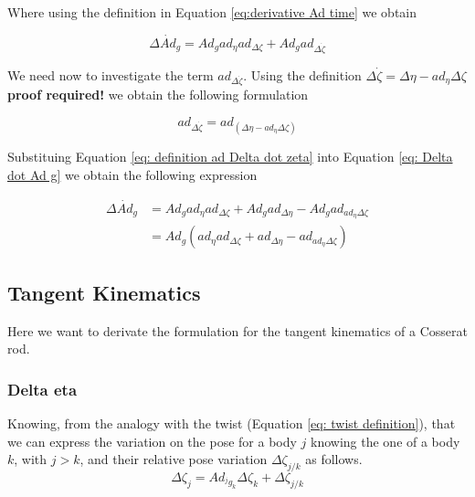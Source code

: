 \documentclass[12pt,a4paper]{book}
\begin{document}
Where using the definition in Equation \eqref{eq:derivative Ad time} we obtain 

\begin{equation}\label{eq: Delta dot Ad g}
	\Delta \dot{Ad}_g = Ad_g ad_\eta ad_{\Delta \zeta} + Ad_g  ad_{\Delta \dot{\zeta} }
\end{equation}

We need now to investigate the term $ad_{\Delta \dot{\zeta} }$. Using the definition $\Delta \dot{\zeta} = \Delta \eta - ad_\eta \Delta \zeta$ \color{red}\textbf{proof required!}\color{black} we obtain the following formulation 

\begin{equation}\label{eq: definition ad Delta dot zeta}
	ad_{\Delta \dot{\zeta}} = ad_{(\Delta \eta - ad_\eta \Delta \zeta)}
\end{equation}

Substituing Equation \eqref{eq: definition ad Delta dot zeta} into Equation \eqref{eq: Delta dot Ad g} we obtain the following expression

\begin{equation}\label{eq: Delta dot Ad g final}
\begin{aligned}
	\Delta \dot{Ad}_g 	&= Ad_g ad_\eta ad_{\Delta \zeta} + Ad_g ad_{\Delta \eta} - Ad_g ad_{ad_\eta \Delta \zeta} \\
					&= Ad_g \left( ad_\eta ad_{\Delta \zeta} +  ad_{\Delta \eta} -  ad_{ad_\eta \Delta \zeta} \right)
\end{aligned}
\end{equation}



\subsection{Tangent Kinematics}

Here we want to derivate the formulation for the tangent kinematics of a Cosserat rod.

\subsubsection{Delta eta}

Knowing, from the analogy with the twist (Equation \eqref{eq: twist definition}), that we can express the variation on the pose for a body $j$ knowing the one of a body $k$, with $j>k$, and their relative pose variation $\Delta \zeta_{j/k}$ as follows.
\begin{equation}
	\Delta \zeta _ j = Ad_{^j g _k} \Delta \zeta _k + \Delta \zeta _ {j/k}
\end{equation}
\end{document}
